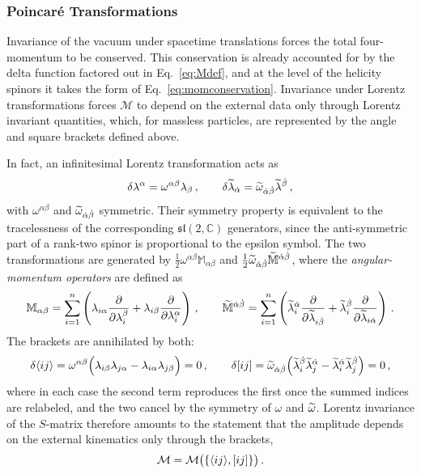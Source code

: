 \subsubsection{Poincaré Transformations}

Invariance of the vacuum under spacetime translations forces the total four-momentum to be
conserved. This conservation is already accounted for by the delta function factored out in
Eq.~\eqref{eq:Mdef}, and at the level of the helicity spinors it takes the form of
Eq.~\eqref{eq:momconservation}. Invariance under
Lorentz transformations forces $\mathcal M$ to depend on the external data only through Lorentz
invariant quantities, which, for massless particles, are represented by the angle and square brackets defined above.

In fact, an infinitesimal Lorentz transformation acts as
\begin{align}\label{eq:lorentztransf}
    \delta \lambda^\alpha = \omega^{\alpha\beta}\lambda_\beta \,, \qquad
    \delta\widetilde{\lambda}_{\dot\alpha} = \widetilde{\omega}_{\dot\alpha\dot\beta}\widetilde{\lambda}^{\dot\beta}\,,
\end{align}
with $\omega^{\alpha\beta}$ and $\widetilde{\omega}_{\dot\alpha\dot\beta}$ symmetric. Their symmetry property is equivalent to the tracelessness of the corresponding
$\mathfrak{sl}(2,\mathbb C)$ generators, since the anti-symmetric part of a rank-two spinor is
proportional to the epsilon symbol. The two transformations are generated by
$\tfrac{1}{2}\omega^{\alpha\beta}\mathbb M_{\alpha\beta}$ and
$\tfrac{1}{2}\widetilde{\omega}_{\dot\alpha\dot\beta}\widetilde{ \mathbb M}^{\dot\alpha\dot\beta}$, where the
\textit{angular-momentum operators} are defined as
\begin{gather}
    \mathbb M_{\alpha\beta} = \sum_{i=1}^n \left(\lambda_{i\alpha}\frac{\partial}{\partial \lambda_i^\beta}
    + \lambda_{i\beta}\frac{\partial}{\partial \lambda_i^\alpha}\right)\,,\qquad
    \widetilde{\mathbb M}^{\dot\alpha\dot\beta} = \sum_{i=1}^n \left(\widetilde{\lambda}_i^{\dot\alpha}\frac{\partial}{\partial \widetilde{\lambda}_{i\dot\beta}}
    + \widetilde{\lambda}_i^{\dot\beta}\frac{\partial}{\partial \widetilde{\lambda}_{i\dot\alpha}}\right)\,.
\end{gather}
The brackets are annihilated by both:
\begin{equation}
    \delta\langle i j \rangle = \omega^{\alpha\beta}\Big(\lambda_{i\beta}\lambda_{j\alpha}
    - \lambda_{i\alpha}\lambda_{j\beta}\Big) = 0\,,
    \qquad
    \delta\lbrack i j \rbrack = \widetilde{\omega}_{\dot\alpha\dot\beta}\Big(\widetilde{\lambda}_i^{\dot\beta}\widetilde{\lambda}_j^{\dot\alpha}
    - \widetilde{\lambda}_i^{\dot\alpha}\widetilde{\lambda}_j^{\dot\beta}\Big) = 0\,,
\end{equation}
where in each case the second term reproduces the first once the summed indices are relabeled, and
the two cancel by the symmetry of $\omega$ and $\widetilde{\omega}$. 
Lorentz invariance of the
$S$-matrix therefore amounts to the statement that the amplitude depends on the external kinematics
only through the brackets,
\begin{equation}
    \mathcal M = \mathcal M\big(\{\langle i j \rangle,\lbrack i j \rbrack\}\big)\,.
\end{equation}


